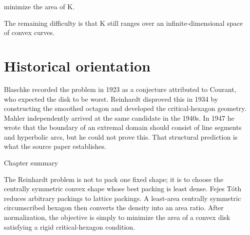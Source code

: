 minimize the area of K.


The remaining difficulty is that K still ranges over an infinite-dimensional space of convex curves.


\section{Historical orientation}

Blaschke recorded the problem in 1923 as a conjecture attributed to Courant, who expected the disk to be worst. Reinhardt disproved this in 1934 by constructing the smoothed octagon and developed the critical-hexagon geometry. Mahler independently arrived at the same candidate in the 1940s. In 1947 he wrote that the boundary of an extremal domain should consist of line segments and hyperbolic arcs, but he could not prove this. That structural prediction is what the source paper establishes.


\begin{insightbox}{Chapter summary}
\end{insightbox}

The Reinhardt problem is not to pack one fixed shape; it is to choose the centrally symmetric convex shape whose best packing is least dense. Fejes Tóth reduces arbitrary packings to lattice packings. A least-area centrally symmetric circumscribed hexagon then converts the density into an area ratio. After normalization, the objective is simply to minimize the area of a convex disk satisfying a rigid critical-hexagon condition.

